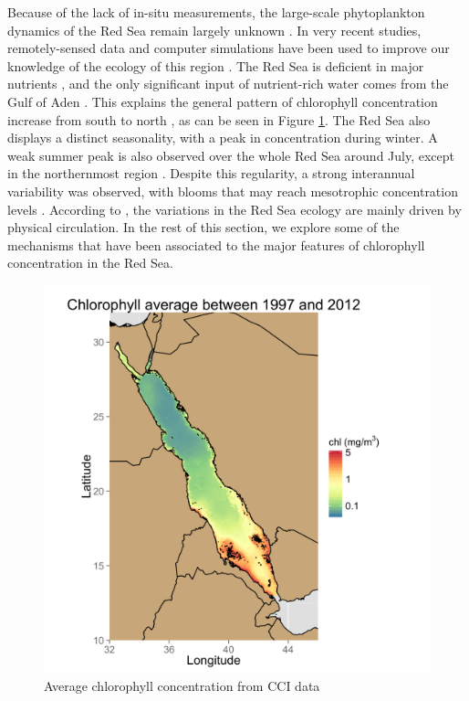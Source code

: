 Because of the lack of in-situ measurements, the large-scale phytoplankton
dynamics of the Red Sea remain largely unknown \citep{Raitsos2013,
Triantafyllou2014}. In very recent studies, remotely-sensed data and computer
simulations have been used to improve our knowledge of the ecology of this
region \citep{Raitsos2013, Racault, Triantafyllou2013}. The Red Sea is
deficient in major nutrients \citep{Weikert1987}, and the only significant
input of nutrient-rich water comes from the Gulf of Aden \citep{Yao2015}. This
explains the general pattern of chlorophyll concentration increase from south
to north \citep{Raitsos2013}, as can be seen in Figure \ref{meanchl}.  The Red Sea
also displays a distinct seasonality, with a peak in concentration during
winter.  A weak summer peak is also observed over the whole Red Sea around
July, except in the northernmost region \citep{Raitsos2013}. Despite this
regularity, a strong interannual variability was observed, with blooms that may
reach mesotrophic concentration levels \citep{Raitsos2013}. According to
\citet{Triantafyllou2014}, the variations in the Red Sea ecology are mainly
driven by physical circulation. In the rest of this section, we explore some of
the mechanisms that have been associated to the major features of chlorophyll
concentration in the Red Sea.

\begin{figure}[h]
    \centering
    \includegraphics[scale=.15]{figures/chl_average.png}
    \caption{Average chlorophyll concentration from CCI data}
    \label{meanchl}
\end{figure}

